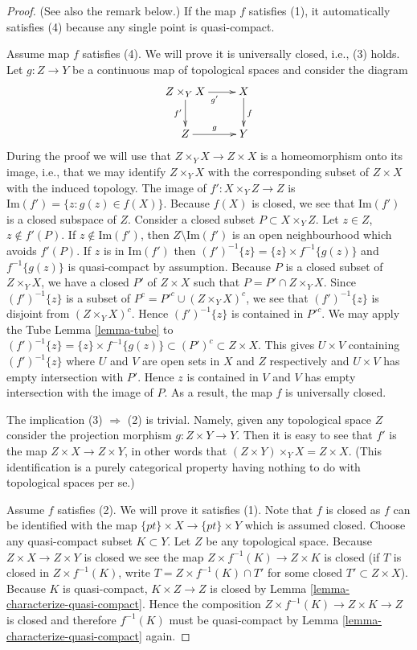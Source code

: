 \begin{proof}
(See also the remark below.)
If the map $f$ satisfies (1), it automatically satisfies (4) because
any single point is quasi-compact.

\medskip\noindent
Assume map $f$ satisfies (4).
We  will prove it is universally closed, i.e., (3) holds.
Let $g : Z \to Y$ be a continuous map of topological spaces
and consider the diagram
$$
\xymatrix{
Z \times_Y X \ar[r]_{g'} \ar[d]_{f'} & X \ar[d]^f \\
Z \ar[r]^g & Y
}
$$
During the proof we will use that $Z \times_Y X \to Z \times X$
is a homeomorphism onto its image, i.e., that we may identify
$Z \times_Y X$ with the corresponding subset of $Z \times X$ with
the induced topology.
The image of $f' : X \times_Y Z \to Z$ is
$\text{Im}(f') = \{z : g(z) \in f(X)\}$.
Because $f(X)$ is closed, we see that
$\text{Im}(f')$ is a closed subspace of $Z$.
Consider a closed subset $P \subset X \times_Y Z$.
Let $z \in Z$, $z \not \in f'(P)$.
If $z \not \in \text{Im}(f')$, then $Z \setminus \text{Im}(f')$
is an open neighbourhood which avoids $f'(P)$.
If $z$ is in $\text{Im}(f')$
then $(f')^{-1}\{z\} = \{z\} \times f^{-1}\{g(z)\}$
and $f^{-1}\{g(z)\}$
is quasi-compact by assumption. Because $P$ is a closed
subset of $Z \times_Y X$, we have a closed $P'$ of $Z\times X$ such
that $P = P' \cap Z \times_Y X$.
Since $(f')^{-1}\{z\}$ is a subset of $P^c = P'^c \cup (Z \times_Y X)^c$,
we see that $(f')^{-1}\{z\}$ is disjoint from $(Z \times_Y X)^c$.
Hence $(f')^{-1}\{z\}$ is contained in $P'^c$.
We may apply the Tube Lemma \ref{lemma-tube} to
$(f')^{-1}\{z\} = \{z\} \times f^{-1}\{g(z)\}
\subset (P')^c \subset Z \times X$.
This gives $U\times V$ containing
$(f')^{-1}\{z\}$ where $U$ and $V$ are open sets in $X$ and $Z$
respectively and $U\times V$ has empty intersection with $P'$. Hence
$z$ is contained in $V$ and $V$ has empty intersection with the image
of $P$. As a result, the map $f$ is universally closed.

\medskip\noindent
The implication (3) $\Rightarrow$ (2) is trivial.
Namely, given any topological space $Z$ consider the projection
morphism $g : Z \times Y \to Y$. Then it is easy to see
that $f'$ is the map $Z \times X \to Z \times Y$, in other
words that $(Z \times Y) \times_Y X = Z \times X$. (This identification
is a purely categorical property having nothing to do with
topological spaces per se.)

\medskip\noindent
Assume $f$ satisfies (2). We will prove it satisfies (1).
Note that $f$ is closed as $f$ can be identified with the map
$\{pt\} \times X \to \{pt\} \times Y$ which is assumed closed.
Choose any quasi-compact subset $K \subset Y$.
Let $Z$ be any topological space.
Because $Z\times X \to Z\times Y$ is closed
we see the map $Z \times f^{-1}(K) \to Z \times K$
is closed (if $T$ is closed in $Z \times f^{-1}(K)$, write
$T = Z \times f^{-1}(K) \cap T'$ for some closed
$T' \subset Z \times X$). Because $K$ is quasi-compact,
$K\times Z\to Z$ is closed by Lemma \ref{lemma-characterize-quasi-compact}.
Hence the composition $Z \times f^{-1}(K)\to Z \times K \to Z$
is closed and therefore $f^{-1}(K)$ must be quasi-compact
by Lemma \ref{lemma-characterize-quasi-compact} again.
\end{proof}

